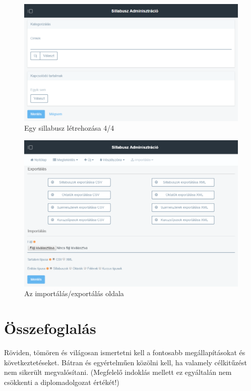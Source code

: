 \documentclass[hidelinks, 12pt, a4paper]{report}
\begin{document}
\begin{figure}[H]
    \centering
	\includegraphics[width=\textwidth]{sm_syllabus_add_4.png}
	\caption{Egy sillabusz létrehozása 4/4}
\end{figure}

\begin{figure}[H]
    \centering
	\includegraphics[width=\textwidth]{sm_import_export.png}
	\caption{Az importálás/exportálás oldala}
\end{figure}

\chapter{Összefoglalás}

Röviden, tömören és világosan ismertetni kell a fontosabb megállapításokat és következtetéseket. Bátran és egyértelműen közölni kell, ha valamely célkitűzést nem sikerült megvalósítani. (Megfelelő indoklás mellett ez egyáltalán nem csökkenti a diplomadolgozat értékét!)
\end{document}
